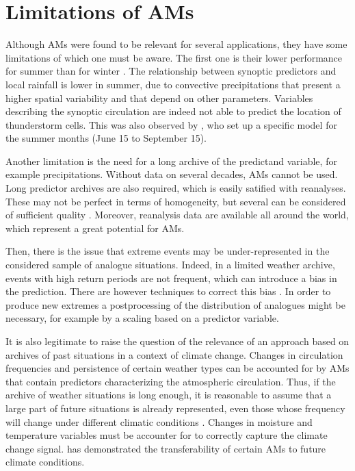 \documentclass[review]{elsarticle}
\begin{document}
\section{Limitations of AMs}
\label{sec:limitations}

Although AMs were found to be relevant for several applications, they have some limitations of which one must be aware. The first one is their lower performance for summer than for winter \citep{Bliefernicht2010}. The relationship between synoptic predictors and local rainfall is lower in summer, due to convective precipitations that present a higher spatial variability and that depend on other parameters. Variables describing the synoptic circulation are indeed not able to predict the location of thunderstorm cells. This was also observed by \citet{BenDaoud2010}, who set up a specific model for the summer months (June 15 to September 15).

Another limitation is the need for a long archive of the predictand variable, for example precipitations. Without data on several decades, AMs cannot be used. Long predictor archives are also required, which is easily satified with reanalyses. These may not be perfect in terms of homogeneity, but several can be considered of sufficient quality \cite{Horton2018b}. Moreover, reanalysis data are available all around the world, which represent a great potential for AMs.

Then, there is the issue that extreme events may be under-represented in the considered sample of analogue situations. Indeed, in a limited weather archive, events with high return periods are not frequent, which can introduce a bias in the prediction. There are however techniques to correct this bias \citep[see][]{Marty2010}. In order to produce new extremes a postprocessing of the distribution of analogues might be necessary, for example by a scaling based on a predictor variable.

It is also legitimate to raise the question of the relevance of an approach based on archives of past situations in a context of climate change. Changes in circulation frequencies and persistence of certain weather types \citep{Hewitson1996} can be accounted for by AMs that contain predictors characterizing the atmospheric circulation. Thus, if the archive of weather situations is long enough, it is reasonable to assume that a large part of future situations is already represented, even those whose frequency will change under different climatic conditions \citep{Wetterhall2005}. Changes in moisture and temperature variables must be accounter for to correctly capture the climate change signal. \citet{Dayon2015} has demonstrated the transferability of certain AMs to future climate conditions.
\end{document}
